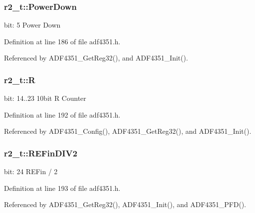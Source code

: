 \subsubsection[{\texorpdfstring{Power\+Down}{PowerDown}}]{ r2\+\_\+t\+::\+Power\+Down}\hypertarget{structr2__t_a3aadc869234fb281b178032be276ca00}{}\label{structr2__t_a3aadc869234fb281b178032be276ca00}
bit\+: 5 Power Down 

Definition at line 186 of file adf4351.\+h.



Referenced by A\+D\+F4351\+\_\+\+Get\+Reg32(), and A\+D\+F4351\+\_\+\+Init().

\subsubsection[{\texorpdfstring{R}{R}}]{ r2\+\_\+t\+::R}\hypertarget{structr2__t_a0abc2956b7cbc989552c17264973d24d}{}\label{structr2__t_a0abc2956b7cbc989552c17264973d24d}
bit\+: 14..23 10bit R Counter 

Definition at line 192 of file adf4351.\+h.



Referenced by A\+D\+F4351\+\_\+\+Config(), A\+D\+F4351\+\_\+\+Get\+Reg32(), and A\+D\+F4351\+\_\+\+Init().

\subsubsection[{\texorpdfstring{R\+E\+Fin\+D\+I\+V2}{REFinDIV2}}]{ r2\+\_\+t\+::\+R\+E\+Fin\+D\+I\+V2}\hypertarget{structr2__t_aa036b7abbb6147e0c155101addc1490c}{}\label{structr2__t_aa036b7abbb6147e0c155101addc1490c}
bit\+: 24 R\+E\+Fin / 2 

Definition at line 193 of file adf4351.\+h.



Referenced by A\+D\+F4351\+\_\+\+Get\+Reg32(), A\+D\+F4351\+\_\+\+Init(), and A\+D\+F4351\+\_\+\+P\+F\+D().


